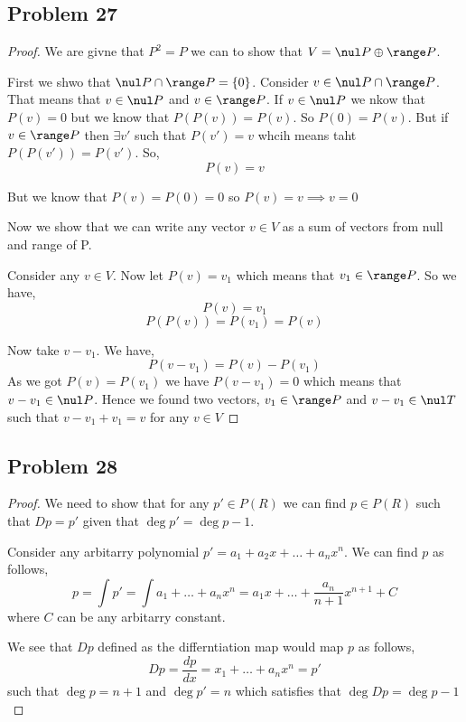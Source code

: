 \documentclass[a4paper]{report}
\begin{document}
\subsection*{Problem 27}
\begin{proof}
    We are givne that $P^2 = P$ we can to show that $V = \nul P \oplus \range P$.

    First we shwo that  $\nul P \cap \range P = \{0\}$. Consider  $v \in \nul P \cap \range P$. That means that  $v \in \nul P $ and $v \in \range P$.  If $v \in \nul P$ we nkow that $P(v) = 0$ but we know that  $P(P(v)) = P(v)$. So  $P(0) = P(v)$. But if $v \in \range P$ then $\exists v'$ such that $P(v') = v$ whcih means taht  $P(P(v')) = P(v')$. So,  
    $$ P(v) = v $$

    But we know that $P(v) = P(0) = 0$ so  $P(v) = v \implies v = 0$

    Now we show that we can write any vector  $v \in V$ as a sum of vectors from null and range of P.

    Consider any $v \in V$. Now let $P(v) = v_1$ which means that $v_1 \in \range P$. So we have, 
    $$ P(v) = v_1 $$ 
    $$ P(P(v)) = P(v_1) = P(v) $$ 

    Now take $v - v_1$. We have, 
    $$ P(v - v_1) = P(v) - P(v_1) $$ 
    As we got  $P(v) = P(v_1)$ we have $P(v - v_1) = 0$ which means that $v - v_1 \in \nul P$. Hence we found two vectors, $v_1 \in \range P$  and $v - v_1 \in \nul T$ such that $v - v_1 + v_1 = v$ for any $v \in V$

\end{proof}



\subsection*{Problem 28}
\begin{proof}
    
    We need to show that for any $p' \in P(R)$ we can find $p \in P(R)$ such that $Dp = p'$ given that  $\deg p' = \deg p - 1$.

    Consider any arbitarry polynomial  $p' = a_1 + a_2x + \dots + a_nx^{n}$. We can find $p$ as follows, 
    $$ p = \int  p' = \int a_1 + \dots + a_nx^{n} = a_1x + \dots + \frac{a_n}{n+1}x^{n+1} + C$$  where $C$ can be any arbitarry constant.

    We see that $Dp$ defined as the differntiation map would map $p$  as follows, 
    $$ Dp = \frac{dp}{dx} = x_1 + \dots +a_nx^{n} = p'$$  such that $\deg p = n+1 $ and $\deg p' = n$ which satisfies that  $\deg Dp = \deg p - 1$
    $$  $$ 
\end{proof}
\end{document}
